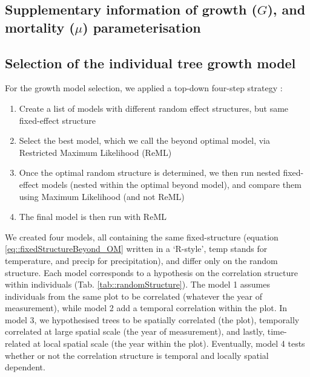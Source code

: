 \documentclass[letterpaper, 12pt]{article}
\theoremstyle{theo}
\begin{document}
\tableofcontents
\listoftables
\listoffigures

\begin{refsection}
\begin{onehalfspace}

\section{Supplementary information of growth ($ G $), and mortality ($ \mu $) parameterisation} \label{app::glmm}
\subsection{Selection of the individual tree growth model}
For the growth model selection, we applied a top-down four-step strategy \citep[Chapter 5]{Zuur2009}:
\begin{enumerate}
	\item Create a list of models with different random effect structures, but same fixed-effect structure
	\item Select the best model, which we call the beyond optimal model, via Restricted Maximum Likelihood (ReML)
	\item Once the optimal random structure is determined, we then run nested fixed-effect models (nested within the optimal beyond model), and compare them using Maximum Likelihood (and not ReML)
	\item The final model is then run with ReML
\end{enumerate}

We created four models, all containing the same fixed-structure (equation \eqref{eq::fixedStructureBeyond_OM} written in a `R-style', temp stands for temperature, and precip for precipitation), and differ only on the random structure. Each model corresponds to a hypothesis on the correlation structure within individuals (Tab. \ref{tab::randomStructure}). The model 1 assumes individuals from the same plot to be correlated (whatever the year of measurement), while model 2 add a temporal correlation within the plot. In model 3, we hypothesised trees to be spatially correlated (the plot), temporally correlated at large spatial scale (the year of measurement), and lastly, time-related at local spatial scale (the year within the plot). Eventually, model 4 tests whether or not the correlation structure is temporal and locally spatial dependent.


\end{onehalfspace}
\end{refsection}
\end{document}
